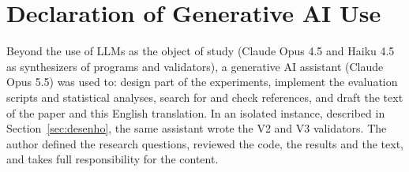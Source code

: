 \documentclass[sigconf,nonacm]{acmart}
\begin{document}
\section*{Declaration of Generative AI Use}

Beyond the use of LLMs as the object of study (Claude Opus 4.5 and Haiku 4.5 as synthesizers of programs and validators), a generative AI assistant (Claude Opus 5.5) was used to: design part of the experiments, implement the evaluation scripts and statistical analyses, search for and check references, and draft the text of the paper and this English translation. In an isolated instance, described in Section~\ref{sec:desenho}, the same assistant wrote the V2 and V3 validators. The author defined the research questions, reviewed the code, the results and the text, and takes full responsibility for the content.
\end{document}
